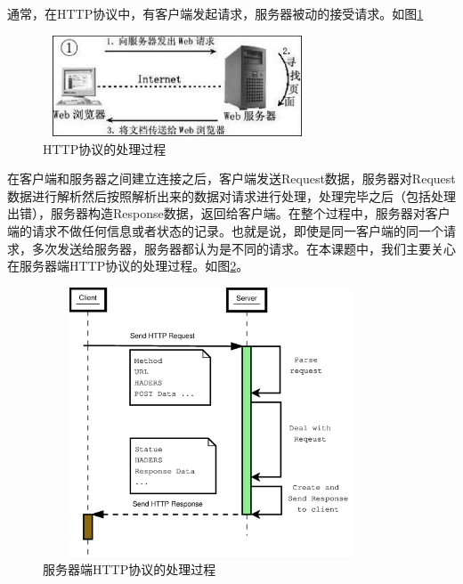 \documentclass[twoside, xetex]{report}
\begin{document}
	通常，在HTTP协议中，有客户端发起请求，服务器被动的接受请求。如图\ref{httpbaike}
	\begin{figure}[htbp]
	\centering
	\includegraphics[height=3cm, width=8cm]{pics/httpbaike.eps}
	\caption{HTTP协议的处理过程}
	\label{httpbaike}
	\end{figure}
	
	在客户端和服务器之间建立连接之后，客户端发送Request数据，服务器对Request数据进行解析然后按照解析出来的数据对请求进行处理，处理完毕之后（包括处理出错），服务器构造Response数据，返回给客户端。在整个过程中，服务器对客户端的请求不做任何信息或者状态的记录。也就是说，即使是同一客户端的同一个请求，多次发送给服务器，服务器都认为是不同的请求。在本课题中，我们主要关心在服务器端HTTP协议的处理过程。如图\ref{serverhttp}。
	\begin{figure}[htbp]
	\centering
	\includegraphics[height=8cm, width=10cm]{pics/serverhttp.eps}
	\caption{服务器端HTTP协议的处理过程}
	\label{serverhttp}
	\end{figure}
	
\end{document}
